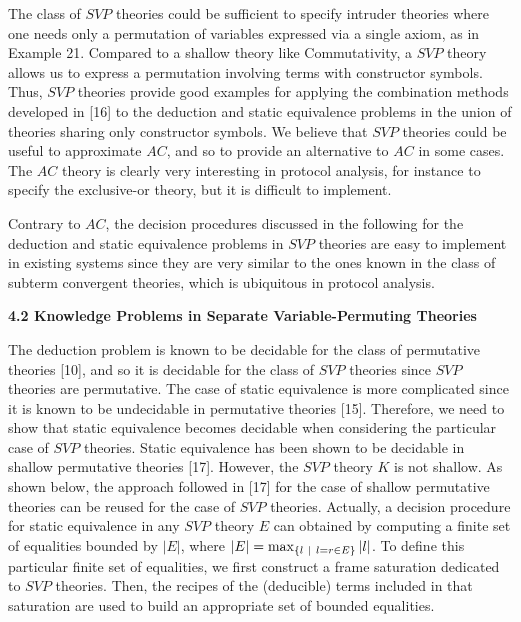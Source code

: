  
The class of $\mathit{SVP}$ theories could be sufficient to specify intruder theories where one needs only a permutation of variables expressed via a single axiom, as in Example 21. Compared to a shallow theory like Commutativity, a $\mathit{SVP}$ theory allows us to express a permutation involving terms with constructor symbols. Thus, $\mathit{SVP}$ theories provide good examples for applying the combination methods developed in [16] to the deduction and static equivalence problems in the union of theories sharing only constructor symbols. We believe that $\mathit{SVP}$ theories could be useful to approximate $AC$, and so to provide an alternative to $AC$ in some cases. The $AC$ theory is clearly very interesting in protocol analysis, for instance to specify the exclusive-or theory, but it is difficult to implement.\par
 
 
 
Contrary to $AC$, the decision procedures discussed in the following for the deduction and static equivalence problems in $\mathit{SVP}$ theories are easy to implement in existing systems since they are very similar to the ones known in the class of subterm convergent theories, which is ubiquitous in protocol analysis.\par
 
 
 
 
\par\medskip\noindent\textbf{4.2 Knowledge Problems in Separate Variable-Permuting Theories}\par
 
 
The deduction problem is known to be decidable for the class of permutative theories [10], and so it is decidable for the class of $\mathit{SVP}$ theories since $\mathit{SVP}$ theories are permutative. The case of static equivalence is more complicated since it is known to be undecidable in permutative theories [15]. Therefore, we need to show that static equivalence becomes decidable when considering the particular case of $\mathit{SVP}$ theories. Static equivalence has been shown to be decidable in shallow permutative theories [17]. However, the $\mathit{SVP}$ theory $K$ is not shallow. As shown below, the approach followed in [17] for the case of shallow permutative theories can be reused for the case of $\mathit{SVP}$ theories. Actually, a decision procedure for static equivalence in any $\mathit{SVP}$ theory $E$ can obtained by computing a finite set of equalities bounded by $|E|$, where $|E|=\max_{\{l\leavevmode\nobreak\ |\leavevmode\nobreak\ l=r\in E\}}|l|$. To define this particular finite set of equalities, we first construct a frame saturation dedicated to $\mathit{SVP}$ theories. Then, the recipes of the (deducible) terms included in that saturation are used to build an appropriate set of bounded equalities.\par
 
